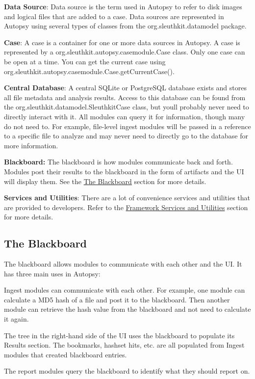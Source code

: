 \begin{DoxyItemize}
\item {\bfseries Data Source}\+: Data source is the term used in Autopsy to refer to disk images and logical files that are added to a case. Data sources are represented in Autopsy using several types of classes from the org.\+sleuthkit.\+datamodel package.
\item {\bfseries Case}\+: A case is a container for one or more data sources in Autopsy. A case is represented by a org.\+sleuthkit.\+autopsy.\+casemodule.\+Case class. Only one case can be open at a time. You can get the current case using org.\+sleuthkit.\+autopsy.\+casemodule.\+Case.\+get\+Current\+Case().
\item {\bfseries Central Database}\+: A central S\+Q\+Lite or Postgre\+S\+QL database exists and stores all file metadata and analysis results. Access to this database can be found from the org.\+sleuthkit.\+datamodel.\+Sleuthkit\+Case class, but you\textquotesingle{}ll probably never need to directly interact with it. All modules can query it for information, though many do not need to. For example, file-\/level ingest modules will be passed in a reference to a specific file to analyze and may never need to directly go to the database for more information.
\item {\bfseries Blackboard\+:} The blackboard is how modules communicate back and forth. Modules post their results to the blackboard in the form of artifacts and the UI will display them. See the \hyperlink{platform_page_platform_blackboard}{The Blackboard} section for more details.
\item {\bfseries Services and Utilities}\+: There are a lot of convenience services and utilities that are provided to developers. Refer to the \hyperlink{platform_page_mod_dev_other_services}{Framework Services and Utilities} section for more details.
\end{DoxyItemize}\hypertarget{platform_page_platform_blackboard}{}\subsection{The Blackboard}\label{platform_page_platform_blackboard}
The blackboard allows modules to communicate with each other and the UI. It has three main uses in Autopsy\+:
\begin{DoxyItemize}
\item Ingest modules can communicate with each other. For example, one module can calculate a M\+D5 hash of a file and post it to the blackboard. Then another module can retrieve the hash value from the blackboard and not need to calculate it again.
\item The tree in the right-\/hand side of the UI uses the blackboard to populate its Results section. The bookmarks, hashset hits, etc. are all populated from Ingest modules that created blackboard entries.
\item The report modules query the blackboard to identify what they should report on.
\end{DoxyItemize}

